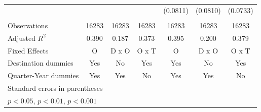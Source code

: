 \documentclass[a4paper,12pt]{article}
\newcommand{\sym}[1]{\rlap{#1}}
\begin{document}
\begin{table}
\begin{tabular}{l*{6}{c}}
	&                   &                   &                   &  (0.0811)         &  (0.0810)         &  (0.0733)         \\
	&\\
	\hline
	Observations                            &     16283         &     16283         &     16283         &     16283         &     16283         &     16283         \\
	Adjusted \(R^{2}\)                      &     0.390         &     0.187         &     0.373         &     0.395         &     0.200         &     0.379         \\
	Fixed Effects                           &         O         &     D x O         &     O x T         &         O         &     D x O         &     O x T         \\
	Destination dummies                     &       Yes         &        No         &       Yes         &       Yes         &        No         &       Yes         \\
	Quarter-Year dummies                    &       Yes         &       Yes         &        No         &       Yes         &       Yes         &        No         \\
	\hline\hline
	\multicolumn{7}{l}{\footnotesize Standard errors in parentheses}\\
	\multicolumn{7}{l}{\footnotesize \sym{*} \(p<0.05\), \sym{**} \(p<0.01\), \sym{***} \(p<0.001\)}\\
\end{tabular}
\end{table}
\end{document}
